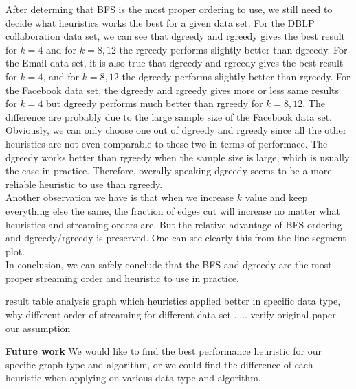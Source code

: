 \documentclass[12pt]{article}
\begin{document}
After determing that BFS is the most proper ordering to use, we still need to decide what heuristics works the best for a given data set. For the DBLP collaboration data set, we can see that dgreedy and rgreedy gives the best result for $k=4$ and for $k=8, 12$ the rgreedy performs slightly better than dgreedy. For the Email data set, it is also true that dgreedy and rgreedy gives the best result for $k=4$, and for $k=8, 12$ the dgreedy performs slightly better than rgreedy. For the Facebook data set, the dgreedy and rgreedy gives more or less same results for $k=4$ but dgreedy performs much better than rgreedy for $k=8, 12$. The difference are probably due to the large sample size of the Facebook data set. Obviously, we can only choose one out of dgreedy and rgreedy since all the other heuristics are not even comparable to these two in terms of performace. The dgreedy works better than rgreedy when the sample size is large, which is usually the case in practice. Therefore, overally speaking dgreedy seems to be a more reliable heuristic to use than rgreedy.\\

Another observation we have is that when we increase $k$ value and keep everything else the same, the fraction of edges cut will increase no matter what heuristics and streaming orders are. But the relative advantage of BFS ordering and dgreedy/rgreedy is preserved. One can see clearly this from the line segment plot. \\

In conclusion, we can safely conclude that the BFS and dgreedy are the most proper streaming order and heuristic to use in practice.

 result table
 analysis graph
 	which heuristics applied better in specific data type, why
	different order of streaming for different data set
	.....
verify original paper
our assumption

\textbf{Future work}
We would like to find the best performance heuristic for our specific graph type and algorithm, or we could find the difference of each heuristic when applying on various data type and algorithm.



\end{document}
